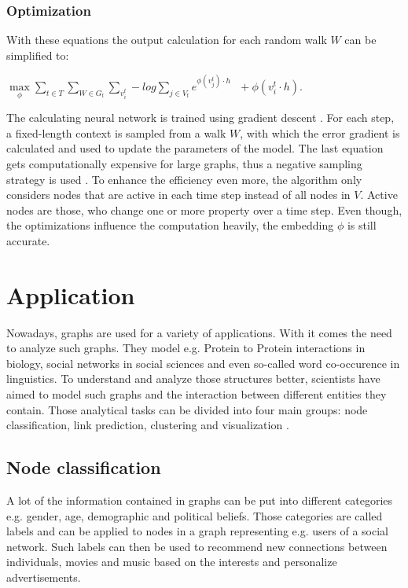 \documentclass[sigconf]{acmart}
\begin{document}
\subsubsection{Optimization}
With these equations the output calculation for each random walk \(W\) can be simplified to: 
\begin{center}
  \(\max\limits_\phi \sum\limits_{t \in T}\sum\limits_{W\in G_t}\sum\limits_{v_i^t} -log\sum\limits_{j\in V_t} e^{\phi(v_j^t)\cdot h}\:\:\: +\phi(v_i^t \cdot h)\).
\end{center}
The calculating neural network is trained using gradient descent \cite{Ruder.15.09.2016}. For each step, a fixed-length context is sampled from a walk \(W\), with which the error gradient is calculated and used to update the parameters of the model.
The last equation gets computationally expensive for large graphs, thus a negative sampling strategy is used \cite{Goldberg.15.02.2014}. To enhance the efficiency even more, 
the algorithm only considers nodes that are active in each time step instead of all nodes in \(V\). Active nodes are those, who change one or more property over a time step.
Even though, the optimizations influence the computation heavily, the embedding \(\phi\) is still accurate. \cite{Beladev.2020}


\section{Application}
Nowadays, graphs are used for a variety of applications. With it comes the need to analyze such graphs. They model e.g. Protein to Protein interactions in biology, social networks in social sciences and even  so-called word co-occurence in linguistics.
To understand and analyze those structures better, scientists have aimed to model such graphs and the interaction between different entities they contain.
Those analytical tasks can be divided into four main groups: node classification, link prediction, clustering and visualization \cite{Goyal.2018}.

\subsection{Node classification}
A lot of the information contained in graphs can be put into different categories e.g. gender, age, demographic and political beliefs. Those categories are called labels and can be applied to nodes in a graph representing e.g. users of a social network.
Such labels can then be used to recommend new connections between individuals, movies and music based on the interests and personalize advertisements.
\end{document}
